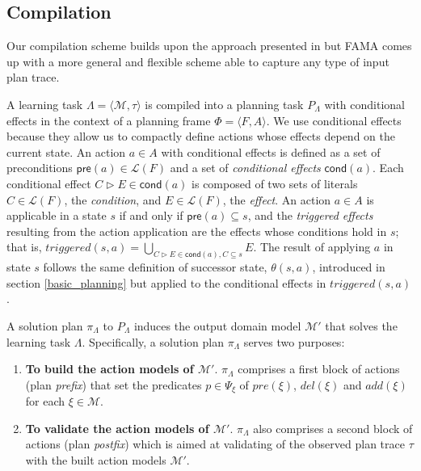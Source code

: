 \documentclass[runningheads]{llncs}
\newcommand{\tup}[1]{{\langle #1 \rangle}}
\newcommand{\pre}{\mathsf{pre}}     %
\newcommand{\cond}{\mathsf{cond}}   %
\newcommand{\FAMA}{{\small {\sffamily FAMA}}\xspace}
\begin{document}
\subsection{Compilation}
Our compilation scheme builds upon the approach presented in \cite{aineto2018learning} but \FAMA comes up with a more general and flexible scheme able to capture any type of input plan trace.

\vspace{0.1cm}

A learning task $\Lambda=\tup{\mathcal{M},\tau}$ is compiled into a planning task $P_{\Lambda}$ with conditional effects in the context of a planning frame $\Phi=\tup{F,A}$. We use conditional effects because they allow us to compactly define actions whose effects depend on the current state. An action $a\in A$ with conditional effects is defined as a set of preconditions $\pre(a)\in\mathcal{L}(F)$ and a set of {\em conditional effects} $\cond(a)$. Each conditional effect $C\rhd E\in\cond(a)$ is composed of two sets of literals $C\in\mathcal{L}(F)$, the {\em condition}, and $E\in\mathcal{L}(F)$, the {\em effect}. An action $a\in A$ is applicable in a state $s$ if and only if $\pre(a)\subseteq s$, and the {\em triggered effects} resulting from the action application are the effects whose conditions hold in $s$; that is, $triggered(s,a)=\bigcup\limits_{C\rhd E\in\cond(a),C\subseteq s} E$. The result of applying $a$ in state $s$ follows the same definition of successor state, $\theta(s,a)$, introduced in section \ref{basic_planning} but applied to the conditional effects in $triggered(s,a)$.


\vspace{0.25cm}

A solution plan $\pi_\Lambda$ to $P_{\Lambda}$ induces the output domain model $\mathcal{M}'$ that solves the learning task $\Lambda$. Specifically, a solution plan $\pi_\Lambda$ serves two purposes:

\begin{enumerate}
\item {\bf To build the action models of $\mathcal{M}'$}. $\pi_\Lambda$ comprises a first block of actions (plan {\em prefix}) that set the predicates $p\in \Psi_{\xi}$ of $pre(\xi)$, $del(\xi)$ and $add(\xi)$ for each $\xi\in\mathcal{M}$.
\item {\bf To validate the action models of $\mathcal{M}'$}. $\pi_\Lambda$ also comprises a second block of actions (plan {\em postfix}) which is aimed at validating of the observed plan trace $\tau$ with the built action models $\mathcal{M}'$.
\end{enumerate}
\end{document}
